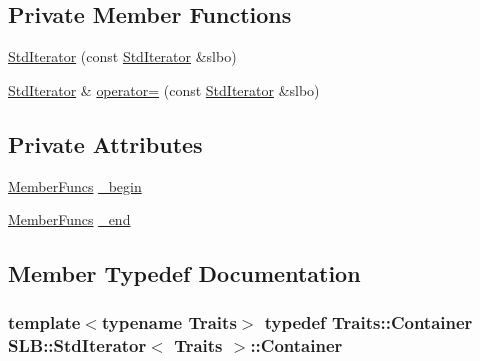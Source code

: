 \subsection*{Private Member Functions}
\begin{DoxyCompactItemize}
\item 
\hyperlink{classSLB_1_1StdIterator_a3da4485e9f0f0faada257e761a3ad3a5}{Std\+Iterator} (const \hyperlink{classSLB_1_1StdIterator}{Std\+Iterator} \&slbo)
\item 
\hyperlink{classSLB_1_1StdIterator}{Std\+Iterator} \& \hyperlink{classSLB_1_1StdIterator_a009d180ddb6b1b51570bf5eda73f9884}{operator=} (const \hyperlink{classSLB_1_1StdIterator}{Std\+Iterator} \&slbo)
\end{DoxyCompactItemize}
\subsection*{Private Attributes}
\begin{DoxyCompactItemize}
\item 
\hyperlink{classSLB_1_1StdIterator_ad7822e03cd31e30c8f2f6a393ce993b9}{Member\+Funcs} \hyperlink{classSLB_1_1StdIterator_a1c40404f63288aa1d21dc945828bb3ae}{\+\_\+begin}
\item 
\hyperlink{classSLB_1_1StdIterator_ad7822e03cd31e30c8f2f6a393ce993b9}{Member\+Funcs} \hyperlink{classSLB_1_1StdIterator_a74296453f134ef29853bd2d649a9883d}{\+\_\+end}
\end{DoxyCompactItemize}


\subsection{Member Typedef Documentation}
\subsubsection[{\texorpdfstring{Container}{Container}}]{\setlength{\rightskip}{0pt plus 5cm}template$<$typename Traits$>$ typedef Traits\+::\+Container {\bf S\+L\+B\+::\+Std\+Iterator}$<$ Traits $>$\+::{\bf Container}}\hypertarget{classSLB_1_1StdIterator_aea113f18b9853918114083198d640da2}{}\label{classSLB_1_1StdIterator_aea113f18b9853918114083198d640da2}
